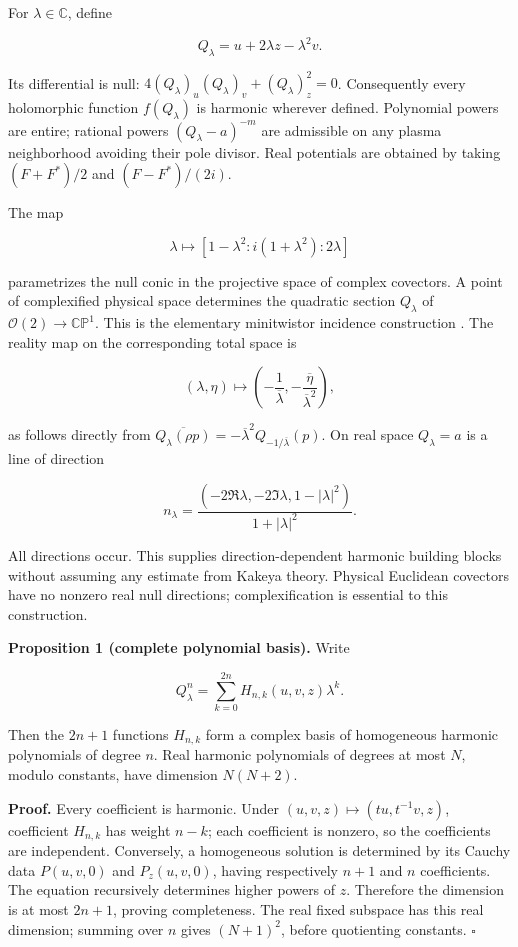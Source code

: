 For \(\lambda\in\mathbb C\), define

\[
Q_\lambda=u+2\lambda z-\lambda^2v.
\]

Its differential is null: \(4(Q_\lambda)_u(Q_\lambda)_v+(Q_\lambda)_z^2=0\). Consequently every holomorphic function \(f(Q_\lambda)\) is harmonic wherever defined. Polynomial powers are entire; rational powers \((Q_\lambda-a)^{-m}\) are admissible on any plasma neighborhood avoiding their pole divisor. Real potentials are obtained by taking \((F+F^*)/2\) and \((F-F^*)/(2i)\).

The map

\[
\lambda\longmapsto[1-\lambda^2:i(1+\lambda^2):2\lambda]
\]

parametrizes the null conic in the projective space of complex covectors. A point of complexified physical space determines the quadratic section \(Q_\lambda\) of \(\mathcal O(2)\to\mathbb{CP}^1\). This is the elementary minitwistor incidence construction \cite{hitchin}. The reality map on the corresponding total space is

\[
(\lambda,\eta)\longmapsto
\left(-\frac1{\overline\lambda},-\frac{\overline\eta}{\overline\lambda^2}\right),
\]

as follows directly from \(\overline{Q_\lambda(\rho p)}=-\overline\lambda^2Q_{-1/\overline\lambda}(p)\). On real space \(Q_\lambda=a\) is a line of direction

\[
n_\lambda=\frac{(-2\Re\lambda,-2\Im\lambda,1-|\lambda|^2)}{1+|\lambda|^2}.
\]

All directions occur. This supplies direction-dependent harmonic building blocks without assuming any estimate from Kakeya theory. Physical Euclidean covectors have no nonzero real null directions; complexification is essential to this construction.

\textbf{Proposition 1 (complete polynomial basis).} Write

\[
Q_\lambda^n=\sum_{k=0}^{2n}H_{n,k}(u,v,z)\lambda^k.
\]

Then the \(2n+1\) functions \(H_{n,k}\) form a complex basis of homogeneous harmonic polynomials of degree \(n\). Real harmonic polynomials of degrees at most \(N\), modulo constants, have dimension \(N(N+2)\).

\textbf{Proof.} Every coefficient is harmonic. Under \((u,v,z)\mapsto(tu,t^{-1}v,z)\), coefficient \(H_{n,k}\) has weight \(n-k\); each coefficient is nonzero, so the coefficients are independent. Conversely, a homogeneous solution is determined by its Cauchy data \(P(u,v,0)\) and \(P_z(u,v,0)\), having respectively \(n+1\) and \(n\) coefficients. The equation recursively determines higher powers of \(z\). Therefore the dimension is at most \(2n+1\), proving completeness. The real fixed subspace has this real dimension; summing over \(n\) gives \((N+1)^2\), before quotienting constants. \(\square\)

